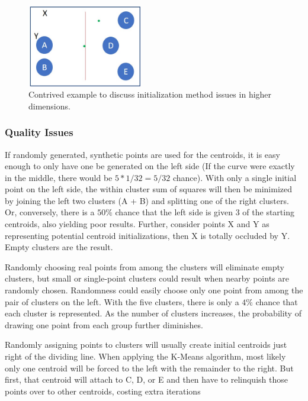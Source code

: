 \documentclass{article}
\begin{document}
\begin{figure}
  \centering
  \includegraphics[width=50mm,scale=0.3]{Contrived-3.jpg}
  \caption{Contrived example to discuss initialization method issues in higher dimensions.}
  \label{fig:contrived}
\end{figure}

\subsubsection{Quality Issues}

If randomly generated, synthetic points are used for the centroids, it is easy enough to only have one be generated on the left side (If the curve were exactly in the middle, there would be $5*1/32=5/32$ chance).  With only a single initial point on the left side, the within cluster sum of squares will then be minimized by joining the left two clusters (A + B) and splitting one of the right clusters.  Or, conversely, there is a $50\%$ chance that the left side is given 3 of the starting centroids, also yielding poor results.  Further, consider points X and Y as representing potential centroid initializations, then X is totally occluded by Y.  Empty clusters are the result.

Randomly choosing real points from among the clusters will eliminate empty clusters, but small or single-point clusters could result when nearby points are randomly chosen.  Randomness could easily choose only one point from among the pair of clusters on the left.  With the five clusters, there is only a $4\%$ chance that each cluster is represented.  As the number of clusters increases, the probability of drawing one point from each group further diminishes.

Randomly assigning points to clusters will usually create initial centroids just right of the dividing line.  When applying the K-Means algorithm, most likely only one centroid will be forced to the left with the remainder to the right.  But first, that centroid will attach to C, D, or E and then have to relinquish those points over to other centroids, costing extra iterations
\end{document}
